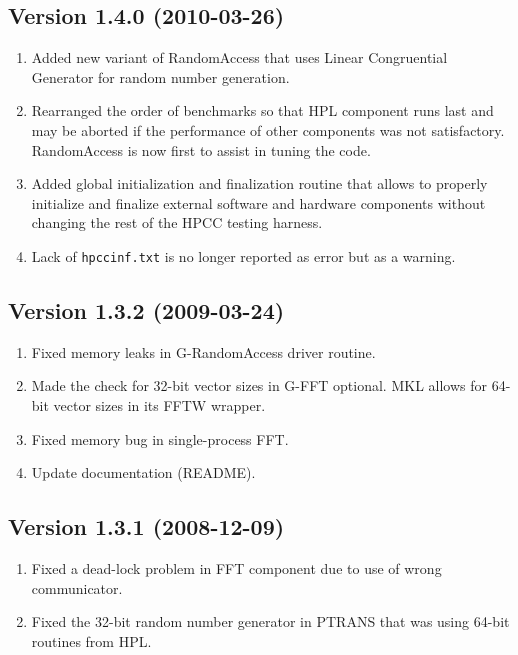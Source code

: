 \documentclass[twocolumn]{article}
\begin{document}
\subsection{Version 1.4.0 (2010-03-26)}
\begin{enumerate}
\item Added new variant of RandomAccess that uses Linear Congruential Generator for random number generation.
\item Rearranged the order of benchmarks so that HPL component runs last and may be aborted
if the performance of other components was not satisfactory. RandomAccess is now first to assist in tuning
the code.
\item Added global initialization and finalization routine that allows to properly initialize
and finalize external software and hardware components without changing the rest of the HPCC testing harness.
\item Lack of \texttt{hpccinf.txt} is no longer reported as error but as a warning.
\end{enumerate}

\subsection{Version 1.3.2 (2009-03-24)}
\begin{enumerate}
\item Fixed memory leaks in G-RandomAccess driver routine.
\item Made the check for 32-bit vector sizes in G-FFT optional. MKL allows for 64-bit vector sizes in its FFTW wrapper.
\item Fixed memory bug in single-process FFT.
\item Update documentation (README).
\end{enumerate}

\subsection{Version 1.3.1 (2008-12-09)}
\begin{enumerate}
\item Fixed a dead-lock problem in FFT component due to use of wrong communicator.
\item Fixed the 32-bit random number generator in PTRANS that was using 64-bit
routines from HPL.
\end{enumerate}
\end{document}
